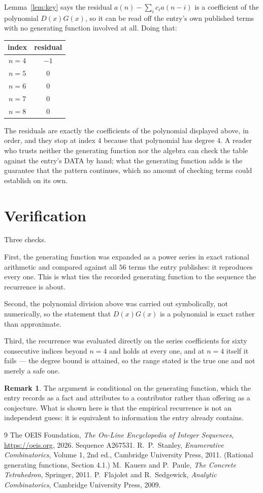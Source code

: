 \documentclass[11pt,a4paper]{article}
\theoremstyle{plain}
\theoremstyle{definition}
\newtheorem{remark}[theorem]{Remark}
\begin{document}
Lemma~\ref{lem:key} says the residual $a(n)-\sum_ic_ia(n-i)$ is a coefficient of the
polynomial $D(x)G(x)$, so it can be read off the entry's own published terms with no
generating function involved at all. Doing that:
\begin{center}
\begin{tabular}{cc}
index & residual \\ \hline
$n=4$ & $-1$ \\
$n=5$ & $0$ \\
$n=6$ & $0$ \\
$n=7$ & $0$ \\
$n=8$ & $0$
\end{tabular}
\end{center}
The residuals are exactly the coefficients of the polynomial displayed above, in order, and
they stop at index $4$ because that polynomial has degree $4$. A reader who trusts
neither the generating function nor the algebra can check the table against the entry's DATA
by hand; what the generating function adds is the guarantee that the pattern continues, which
no amount of checking terms could establish on its own.

\section{Verification}

Three checks.

First, the generating function was expanded as a power series in exact rational arithmetic and
compared against all $56$ terms the entry publishes: it reproduces every one. This is
what ties the recorded generating function to the sequence the recurrence is about.

Second, the polynomial division above was carried out symbolically, not numerically, so the
statement that $D(x)G(x)$ is a polynomial is exact rather than approximate.

Third, the recurrence was evaluated directly on the series coefficients for sixty consecutive
indices beyond $n=4$ and holds at every one, and at $n=4$ itself it fails --- the
degree bound is attained, so the range stated is the true one and not merely a safe one.

\begin{remark}
The argument is conditional on the generating function, which the entry records as a fact and
attributes to a contributor rather than offering as a conjecture. What is shown here is that
the empirical recurrence is not an independent guess: it is equivalent to information the
entry already contains.
\end{remark}

\begin{thebibliography}{9}
 The OEIS Foundation, \emph{The On-Line Encyclopedia of Integer
Sequences}, \url{https://oeis.org}, 2026. Sequence A267531.
 R.~P.~Stanley, \emph{Enumerative Combinatorics}, Volume 1, 2nd ed.,
Cambridge University Press, 2011. (Rational generating functions, Section 4.1.)
 M.~Kauers and P.~Paule, \emph{The Concrete Tetrahedron}, Springer, 2011.
 P.~Flajolet and R.~Sedgewick, \emph{Analytic Combinatorics}, Cambridge
University Press, 2009.
\end{thebibliography}
\end{document}
